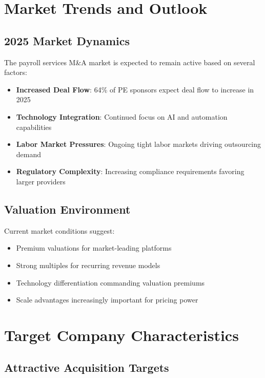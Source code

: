 \documentclass[12pt,a4paper]{article}
\begin{document}
\section{Market Trends and Outlook}

\subsection{2025 Market Dynamics}

The payroll services M\&A market is expected to remain active based on several factors:

\begin{itemize}
    \item \textbf{Increased Deal Flow}: 64\% of PE sponsors expect deal flow to increase in 2025
    \item \textbf{Technology Integration}: Continued focus on AI and automation capabilities
    \item \textbf{Labor Market Pressures}: Ongoing tight labor markets driving outsourcing demand
    \item \textbf{Regulatory Complexity}: Increasing compliance requirements favoring larger providers
\end{itemize}

\subsection{Valuation Environment}

Current market conditions suggest:
\begin{itemize}
    \item Premium valuations for market-leading platforms
    \item Strong multiples for recurring revenue models
    \item Technology differentiation commanding valuation premiums
    \item Scale advantages increasingly important for pricing power
\end{itemize}

\section{Target Company Characteristics}

\subsection{Attractive Acquisition Targets}
\end{document}
